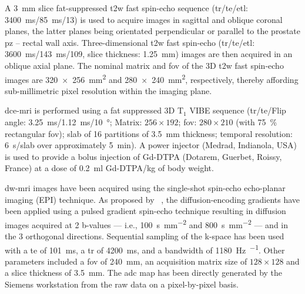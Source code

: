 A \SI{3}{\mm} slice fat-suppressed \ac{t2w} fast spin-echo sequence (\ac{tr}/\ac{te}/\ac{etl}: \SI{3400}{\ms}/\SI{85}{\ms}/13) is used to acquire images in sagittal and oblique coronal planes, the latter planes being orientated perpendicular or parallel to the prostate \ac{pz} – rectal wall axis.
Three-dimensional \ac{t2w} fast spin-echo (\ac{tr}/\ac{te}/\ac{etl}: \SI{3600}{\ms}/\SI{143}{\ms}/109, slice thickness: \SI{1.25}{\mm}) images are then acquired in an oblique axial plane.
The nominal matrix and \ac{fov} of the 3D \ac{t2w} fast spin-echo images are \SI[product-units=repeat]{320x256}{\milli\metre\squared} and \SI[product-units=repeat]{280x240}{\milli\metre\squared}, respectively, thereby affording sub-millimetric pixel resolution within the imaging plane.

\ac{dce}-\ac{mri} is performed using a fat suppressed 3D T$_1$ VIBE sequence (\ac{tr}/\ac{te}/Flip angle: \SI{3.25}{\ms}/\SI{1.12}{\ms}/\SI{10}{\degree}; Matrix: $256 \times 192$; \ac{fov}: $280 \times 210$ (with \SI{75}{\percent} rectangular \ac{fov}); slab of 16 partitions of \SI{3.5}{\mm} thickness; temporal resolution: \SI{6}{\s}/slab over approximately \SI{5}{\minute}).
A power injector (Medrad, Indianola, USA) is used to provide a bolus injection of Gd-DTPA (Dotarem, Guerbet, Roissy, France) at a dose of \SI{0.2}{\ml} Gd-DTPA/kg of body weight.

\ac{dw}-\ac{mri} images have been acquired using the single-shot spin-echo echo-planar imaging (EPI) technique.
As proposed by \citeauthor{stejskal1965spin}~\cite{stejskal1965spin}, the diffusion-encoding gradients have been applied using a pulsed gradient spin-echo technique resulting in diffusion images acquired at 2 b-values --- i.e., \SI{100}{\second\per\milli\meter\squared} and \SI{800}{\second\per\milli\meter\squared} --- and in the 3 orthogonal directions.
Sequential sampling of the k-space has been used with a \ac{te} of \SI{101}{\ms}, a \ac{tr} of \SI{4200}{\ms}, and a bandwidth of \SI{1180}{\hertz\per\px}.
Other parameters included a \ac{fov} of \SI{240}{\milli\metre}, an acquisition matrix size of $128 \times 128$ and a slice thickness of \SI{3.5}{\milli\metre}.
The \ac{adc} map has been directly generated by the Siemens workstation from the raw data on a pixel-by-pixel basis.

